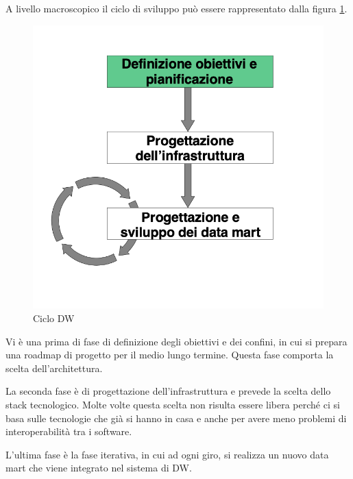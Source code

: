 A livello macroscopico il ciclo di sviluppo può essere rappresentato dalla figura \ref{fig:ciclo}. 
\begin{figure}[H]
	\centering
	\includegraphics[width=0.5\linewidth]{img/cicloDW}
	\caption{Ciclo DW}
	\label{fig:ciclo}
\end{figure}
Vi è una prima di fase di definizione degli obiettivi e dei confini, in cui si prepara una roadmap di progetto per il medio lungo termine. Questa fase comporta la scelta dell’architettura. 

La seconda fase è di progettazione dell’infrastruttura e prevede la scelta dello stack tecnologico. Molte volte questa scelta non risulta essere libera perché ci si basa sulle tecnologie che già si hanno in casa e anche per avere meno problemi di interoperabilità tra i software. 

L’ultima fase è la fase iterativa, in cui ad ogni giro, si realizza un nuovo data mart che viene integrato nel sistema di DW. 
